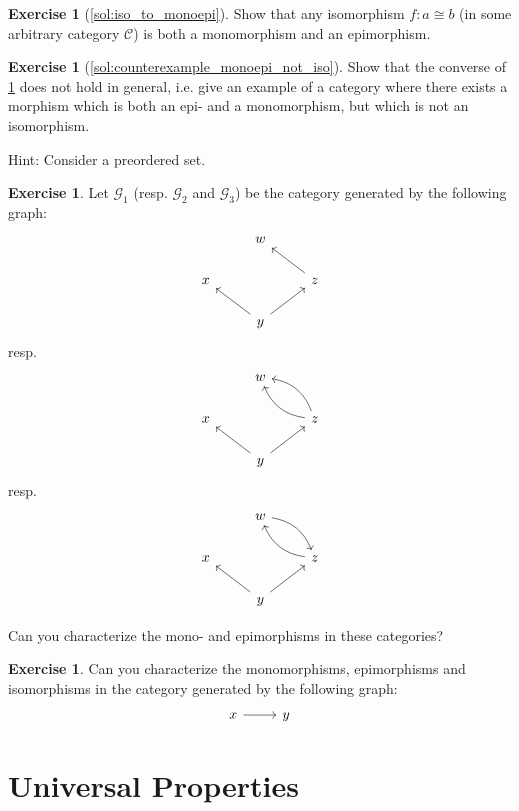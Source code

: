 \documentclass[a4paper,10pt]{scrartcl}
\theoremstyle{plain}
\theoremstyle{definition}
\newtheorem{exer}[thm]{Exercise}
\newcommand{\Cat}[1]{\mathcal{#1}}
\newcommand{\CC}{\Cat{C}}
\begin{document}
\begin{exer}[\cref{sol:iso_to_monoepi}]\label{exer:iso_to_monoepi}
  Show that any isomorphism $f : a\cong b$ (in some arbitrary category $\CC$) is both a monomorphism and an epimorphism.
\end{exer}

\begin{exer}[\cref{sol:counterexample_monoepi_not_iso}]\label{exer:counterexample_monoepi_not_iso}
  Show that the converse of \cref{exer:iso_to_monoepi} does not hold in general, i.e. give an example of a category where there exists a morphism which is both an epi- and a monomorphism, but which is not an isomorphism.

Hint: Consider a preordered set.
\end{exer}

\begin{exer} Let $\mathcal{G}_1$ (resp. $\mathcal{G}_2$ and $\mathcal{G}_3$) be the category generated by the following graph:
\[
\begin{tikzcd}
& w & \\
x & & z \arrow[lu] \\
& y \arrow[lu] \arrow[ru] &
\end{tikzcd}
\]
resp.
\[
\begin{tikzcd}
& w & \\
x & & z \arrow[lu, bend left] \arrow[lu,bend right] \\
& y \arrow[lu] \arrow[ru] &
\end{tikzcd}
\]
resp.
\[
\begin{tikzcd}
& w \arrow[rd,bend left] & \\
x & & z \arrow[lu, bend left] \\
& y \arrow[lu] \arrow[ru] &
\end{tikzcd}
\]

Can you characterize the mono- and epimorphisms in these categories?
\end{exer}

\begin{exer} Can you characterize the monomorphisms, epimorphisms and isomorphisms in the category generated by the following graph:
\[
\begin{tikzcd}
x \arrow[r] & y
\end{tikzcd}
\]
\end{exer}

\section{Universal Properties}\label{sec:universal}
\end{document}
